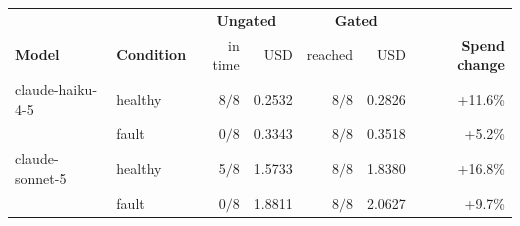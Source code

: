 \setlength{\tabcolsep}{6pt}
\begin{tabular}{@{}l l r r r r r@{}}
\hline
 & & \multicolumn{2}{c}{\textbf{Ungated}} & \multicolumn{2}{c}{\textbf{Gated}} & \\
\textbf{Model} & \textbf{Condition} & in time & USD & reached & USD & \textbf{Spend change} \\
\hline
claude-haiku-4-5 & healthy & 8$/$8 & 0.2532 & 8$/$8 & 0.2826 & +11.6\% \\
 & fault & 0$/$8 & 0.3343 & 8$/$8 & 0.3518 & +5.2\% \\
claude-sonnet-5 & healthy & 5$/$8 & 1.5733 & 8$/$8 & 1.8380 & +16.8\% \\
 & fault & 0$/$8 & 1.8811 & 8$/$8 & 2.0627 & +9.7\% \\
\hline
\end{tabular}
